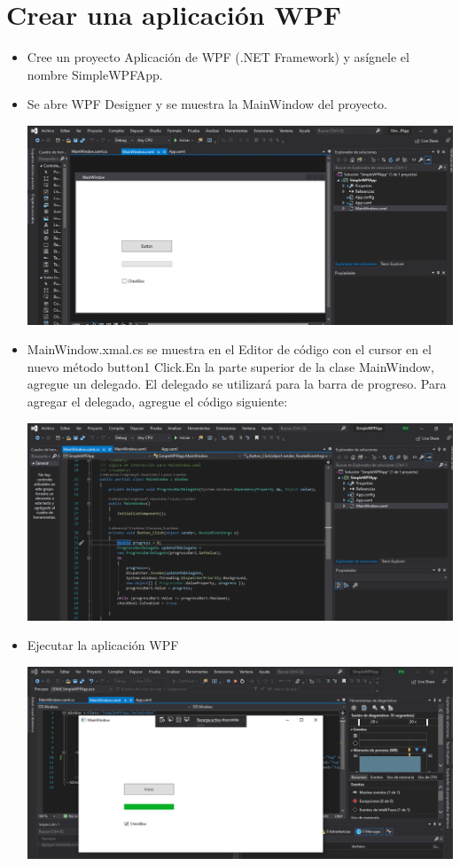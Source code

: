 \section{Crear una aplicación WPF} 
\begin{itemize}
 \item  Cree un proyecto Aplicación de WPF (.NET Framework) y asígnele el nombre SimpleWPFApp.
\item Se abre WPF Designer y se muestra la MainWindow del proyecto.
\begin{center}
\includegraphics[width=\columnwidth]{images/1}\newline
\end{center}
\item MainWindow.xmal.cs se muestra en el Editor de código con el cursor en el nuevo método button1 Click.En la parte superior de la clase MainWindow, agregue un delegado. El delegado se utilizará para la
barra de progreso. Para agregar el delegado, agregue el código siguiente:
\begin{center}
\includegraphics[width=\columnwidth]{images/2}\newline
\end{center}
\item Ejecutar la aplicación WPF
\begin{center}
\includegraphics[width=\columnwidth]{images/3}\newline
\end{center}
\end{itemize}
